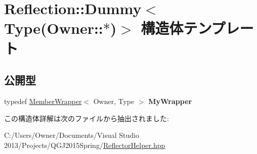 \hypertarget{struct_reflection_1_1_dummy_3_01_type_07_owner_1_1_5_08_4}{}\section{Reflection\+:\+:Dummy$<$ Type(Owner\+:\+:$\ast$)$>$ 構造体テンプレート}
\label{struct_reflection_1_1_dummy_3_01_type_07_owner_1_1_5_08_4}
\subsection*{公開型}
\begin{DoxyCompactItemize}
\item 
typedef \hyperlink{class_reflection_1_1_member_wrapper}{Member\+Wrapper}$<$ Owner, Type $>$ {\bfseries My\+Wrapper}\hypertarget{struct_reflection_1_1_dummy_3_01_type_07_owner_1_1_5_08_4_a601c35c698438de0d6c62e57e3a9dd9e}{}\label{struct_reflection_1_1_dummy_3_01_type_07_owner_1_1_5_08_4_a601c35c698438de0d6c62e57e3a9dd9e}

\end{DoxyCompactItemize}


この構造体詳解は次のファイルから抽出されました\+:\begin{DoxyCompactItemize}
\item 
C\+:/\+Users/\+Owner/\+Documents/\+Visual Studio 2013/\+Projects/\+Q\+G\+J2015\+Spring/\hyperlink{_reflector_helper_8hpp}{Reflector\+Helper.\+hpp}\end{DoxyCompactItemize}
